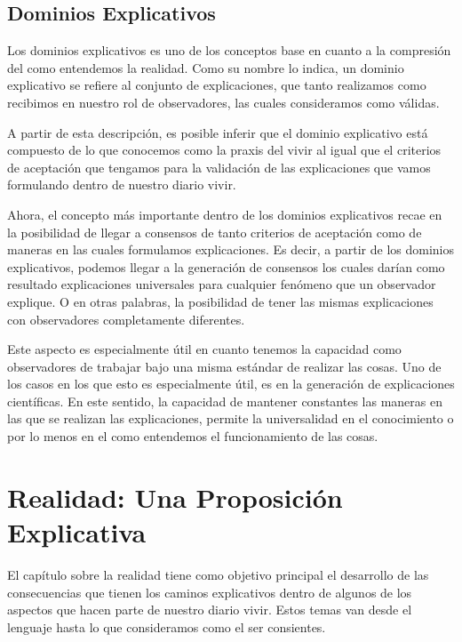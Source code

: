 \documentclass[10pt]{article}
\begin{document}
        \subsection{Dominios Explicativos}

        Los dominios explicativos es uno de los conceptos base en cuanto a la compresión del como entendemos la realidad. Como su nombre lo indica, un dominio explicativo se refiere al conjunto de explicaciones, que tanto realizamos como recibimos en nuestro rol de observadores, las cuales consideramos como válidas. 
        
        A partir de esta descripción, es posible inferir que el dominio explicativo está compuesto de lo que conocemos como la praxis del vivir al igual que el criterios de aceptación que tengamos para la validación de las explicaciones que vamos formulando dentro de nuestro diario vivir.  

        Ahora, el concepto más importante dentro de los dominios explicativos recae en la posibilidad de llegar a consensos de tanto criterios de aceptación como de maneras en las cuales formulamos explicaciones. Es decir, a partir de los dominios explicativos, podemos llegar a la generación de consensos los cuales darían como resultado explicaciones universales para cualquier fenómeno que un observador explique. O en otras palabras, la posibilidad de tener las mismas explicaciones con observadores completamente diferentes.

        Este aspecto es especialmente útil en cuanto tenemos la capacidad como observadores de trabajar bajo una misma estándar de realizar las cosas. Uno de los casos en los que esto es especialmente útil, es en la generación de explicaciones científicas. En este sentido, la capacidad de mantener constantes las maneras en las que se realizan las explicaciones, permite la universalidad en el conocimiento o por lo menos en el como entendemos el funcionamiento de las cosas.

    \section{Realidad: Una Proposición Explicativa}

    El capítulo sobre la realidad tiene como objetivo principal el desarrollo de las consecuencias que tienen los caminos explicativos dentro de algunos de los aspectos que hacen parte de nuestro diario vivir. Estos temas van desde el lenguaje hasta lo que consideramos como el ser consientes.
\end{document}
